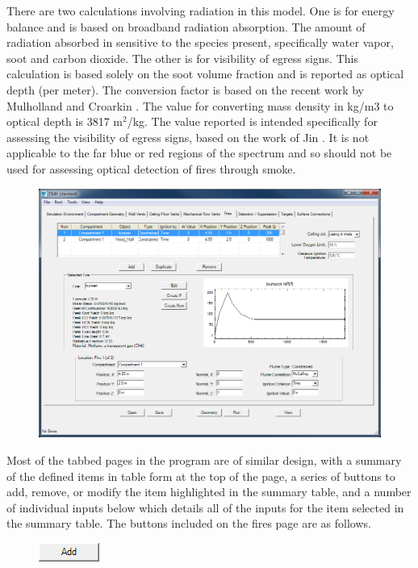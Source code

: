 There are two calculations involving radiation in this model. One is for energy balance and is based on broadband radiation absorption. The amount of radiation absorbed in sensitive to the species present, specifically water vapor, soot and carbon dioxide. The other is for visibility of egress signs. This calculation is based solely on the soot volume fraction and is reported as optical depth (per meter). The conversion factor is based on the recent work by Mulholland and Croarkin \cite{Mullholland:2000}. The value for converting mass density in kg/m3 to optical depth is 3817 m$^2$/kg. The value reported is intended specifically for assessing the visibility of egress signs, based on the work of Jin \cite{Jin:1979}.  It is not applicable to the far blue or red regions of the spectrum and so should not be used for assessing optical detection of fires through smoke.

\begin{figure}[h!]
\begin{center}
\includegraphics[width=6.5in]{FIGURES/Input_File/Fire_Tab}
\end{center}
\end{figure}

Most of the tabbed pages in the program are of similar design, with a summary of the defined items in table form at the top of the page, a series of buttons to add, remove, or modify the item highlighted in the summary table, and a number of individual inputs below which details all of the inputs for the item selected in the summary table. The buttons included on the fires page are as follows.


\begin{figure}
  \includegraphics[width=0.781in]{FIGURES/Input_File/Add_Button}
\end{figure}

